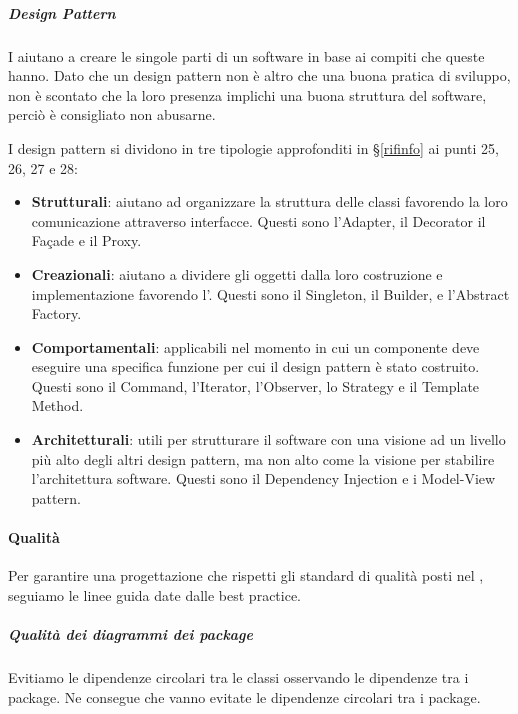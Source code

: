         \subparagraph{Design Pattern}\label{StrumentiDP}
        I  aiutano a creare le singole parti di un software in base ai compiti che queste hanno. Dato che un design pattern non è altro che una buona pratica di sviluppo, non è scontato che la loro presenza implichi una buona struttura del software, perciò è consigliato non abusarne. \par
        I design pattern si dividono in tre tipologie approfonditi in \S\ref{rifinfo} ai punti 25, 26, 27 e 28:
        \begin{itemize}
            \item \textbf{Strutturali}: aiutano ad organizzare la struttura delle classi favorendo la loro comunicazione attraverso interfacce. Questi sono l'Adapter, il Decorator il Façade e il Proxy.
            \item \textbf{Creazionali}: aiutano a dividere gli oggetti dalla loro costruzione e implementazione favorendo l'. Questi sono il Singleton, il Builder, e l'Abstract Factory.
            \item \textbf{Comportamentali}: applicabili nel momento in cui un componente deve eseguire una specifica funzione per cui il design pattern è stato costruito. Questi sono il Command, l'Iterator, l'Observer, lo Strategy e il Template Method.
            \item \textbf{Architetturali}: utili per strutturare il software con una visione ad un livello più alto degli altri design pattern, ma non alto come la visione per stabilire l'architettura software. Questi sono il Dependency Injection e i Model-View pattern.
        \end{itemize}



		\paragraph{Qualità}\label{PP:Sviluppo:QualitàProgettazione}
		Per garantire una progettazione che rispetti gli standard di qualità posti nel {\PdQd}, seguiamo le linee guida date dalle best practice.

        \subparagraph{Qualità dei diagrammi dei package}
        Evitiamo le dipendenze circolari tra le classi osservando le dipendenze tra i package. Ne consegue che vanno evitate le dipendenze circolari tra i package.

